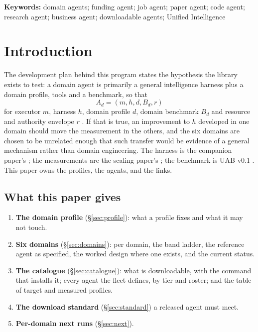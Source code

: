 \noindent\textbf{Keywords:} domain agents; funding agent; job agent; paper agent; code agent; research agent; business agent; downloadable agents; Unified Intelligence

\tableofcontents
\bigskip

\section{Introduction}\label{sec:intro}

The development plan behind this program states the hypothesis the library exists to test: a domain agent is primarily a general intelligence harness plus a domain profile, tools and a benchmark, so that
\[
A_d = (m, h, d, B_d, r)
\]
for executor $m$, harness $h$, domain profile $d$, domain benchmark $B_d$ and resource and authority envelope $r$ \citep{yang2026plan}. If that is true, an improvement to $h$ developed in one domain should move the measurement in the others, and the six domains are chosen to be unrelated enough that such transfer would be evidence of a general mechanism rather than domain engineering. The harness is the companion paper's \citep{yang2026harness}; the measurements are the scaling paper's \citep{yang2026scaling}; the benchmark is UAB v0.1 \citep{yang2026uab}. This paper owns the profiles, the agents, and the links.

\subsection{What this paper gives}

\begin{enumerate}[leftmargin=*]
\item \textbf{The domain profile} (\S\ref{sec:profile}): what a profile fixes and what it may not touch.
\item \textbf{Six domains} (\S\ref{sec:domains}): per domain, the band ladder, the reference agent as specified, the worked design where one exists, and the current status.
\item \textbf{The catalogue} (\S\ref{sec:catalogue}): what is downloadable, with the command that installs it; every agent the fleet defines, by tier and roster; and the table of target and measured profiles.
\item \textbf{The download standard} (\S\ref{sec:standard}) a released agent must meet.
\item \textbf{Per-domain next runs} (\S\ref{sec:next}).
\end{enumerate}


